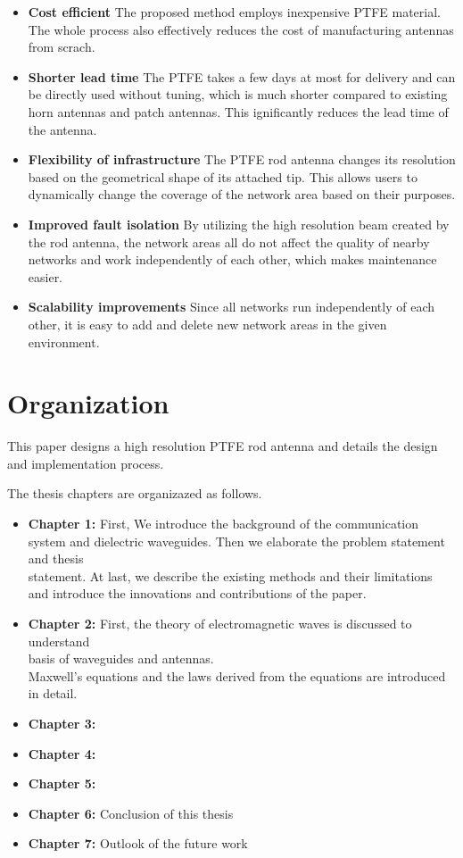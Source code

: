 \documentclass[a4paper,12pt]{report}
\begin{document}
\begin{itemize}
  \item[] \textbf{Cost efficient}
  The proposed method employs inexpensive PTFE material.
  The whole process also effectively reduces the cost of
  manufacturing antennas from scrach.
  \item[] \textbf{Shorter lead time}
  The PTFE takes a few days at most for delivery and can be directly used without tuning,
  which is much shorter compared to existing horn antennas and patch antennas.
  This ignificantly reduces the lead time of the antenna.
  \item[] \textbf{Flexibility of infrastructure}
  The PTFE rod antenna changes its resolution based
  on the geometrical shape of its attached tip.
  This allows users to dynamically change
  the coverage of the network area based on their purposes.
  \item[] \textbf{Improved fault isolation}
  By utilizing the high resolution beam created by the rod antenna,
  the network areas all do not affect the quality of nearby networks and
  work independently of each other,
  which makes maintenance easier.
  \item[] \textbf{Scalability improvements}
  Since all networks run independently of each other,
  it is easy to add and delete new network areas in the given environment.
\end{itemize}

\section{Organization}

This paper designs a high resolution PTFE rod antenna
and details the design and implementation process.

The thesis chapters are organizazed as follows.

\begin{itemize}
  \item[] \textbf{Chapter 1:} First, We introduce the background of the communication \\
  system and dielectric waveguides. Then we elaborate the problem statement and thesis \\
  statement. At last, we describe the existing methods and their limitations \\
  and introduce the innovations and contributions of the paper.
  \item[] \textbf{Chapter 2:} First, the theory of electromagnetic waves is discussed to understand \\
  basis of waveguides and antennas. \\
  Maxwell's equations and the laws derived from the equations are introduced in detail.
  \item[] \textbf{Chapter 3:} %
  \item[] \textbf{Chapter 4:}
  \item[] \textbf{Chapter 5:}
  \item[] \textbf{Chapter 6:} Conclusion of this thesis
  \item[] \textbf{Chapter 7:} Outlook of the future work
\end{itemize}
\end{document}
